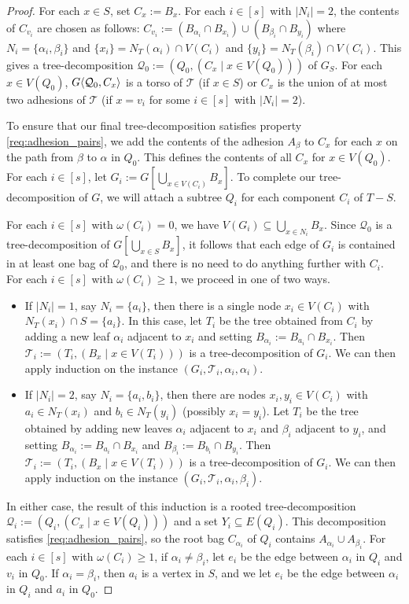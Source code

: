 \begin{proof}
  For each $x\in S$, set $C_x:=B_x$.  For each $i\in[s]$ with $|N_i|=2$, the contents of $C_{v_i}$ are chosen as follows: $C_{v_i}:=(B_{\alpha_i}\cap B_{x_i})\cup (B_{\beta_i}\cap B_{y_i})$ where $N_i=\{\alpha_i,\beta_i\}$ and $\{x_i\}=N_T(\alpha_i)\cap V(C_i)$ and $\{y_i\}=N_T(\beta_i)\cap V(C_i)$.  This gives a tree-decomposition $\mathcal{Q}_0:=(Q_0,(C_x\mid x\in V(Q_0)))$ of $G_S$. For each $x\in V(Q_0)$, ${G}\langle{\mathcal{Q}_0,C_x}\rangle$ is a torso of $\mathcal{T}$ (if $x\in S$) or $C_x$ is the union of at most two adhesions of $\mathcal{T}$ (if $x=v_i$ for some $i\in[s]$ with $|N_i|=2$). 
  
  To ensure that our final tree-decomposition satisfies property \ref{req:adhesion_pairs}, we add the contents of the adhesion $A_\beta$ to $C_x$ for each $x$ on the path from $\beta$ to $\alpha$ in $Q_0$. This defines the contents of all $C_x$ for $x\in V(Q_0)$. For each $i\in[s]$, let $G_i:=G[\bigcup_{x\in V(C_i)}B_x]$.  To complete our tree-decomposition of $G$, we will attach a subtree $Q_i$ for each component $C_i$ of $T-S$.

  For each $i\in[s]$ with $\omega(C_i) = 0$, we have $V(G_i)\subseteq \bigcup_{x\in N_i} B_x$.  Since $\mathcal{Q}_0$ is a tree-decomposition of $G[\bigcup_{x\in S}B_x]$, it follows that each edge of $G_i$ is contained in at least one bag of $\mathcal{Q}_0$, and there is no need to do anything further with $C_i$.  For each $i\in[s]$ with $\omega(C_i)\ge 1$, we proceed in one of two ways. 
  \begin{itemize}
    \item If $|N_i|=1$, say $N_i=\{a_i\}$, then there is a single node $x_i\in V(C_i)$ with $N_T(x_i)\cap S=\{a_i\}$. In this case, let $T_i$ be the tree obtained from $C_i$ by adding a new leaf $\alpha_i$ adjacent to $x_i$ and setting $B_{\alpha_i}:=B_{a_i}\cap B_{x_i}$.  Then $\mathcal{T}_i:=(T_i, (B_x\mid x\in V(T_i)))$ is a tree-decomposition of $G_i$.  We can then apply induction on the instance $(G_i,\mathcal{T}_i,\alpha_i,\alpha_i)$.
    \item If $|N_i|=2$, say $N_i=\{a_i,b_i\}$, then there are nodes $x_i,y_i\in V(C_i)$ with $a_i\in N_T(x_i)$ and $b_i\in N_T(y_i)$ (possibly $x_i=y_i$). Let $T_i$ be the tree obtained by adding new leaves $\alpha_i$ adjacent to $x_i$ and $\beta_i$ adjacent to $y_i$, and setting $B_{\alpha_i}:=B_{a_i}\cap B_{x_i}$ and $B_{\beta_i}:=B_{b_i}\cap B_{y_i}$.  Then $\mathcal{T}_i:=(T_i, (B_x\mid x\in V(T_i)))$ is a tree-decomposition of $G_i$.  We can then apply induction on the instance $(G_i,\mathcal{T}_i,\alpha_i,\beta_i)$.
  \end{itemize}
  In either case, the result of this induction is a rooted tree-decomposition $\mathcal{Q}_i:=(Q_i,(C_x\mid x\in V(Q_i)))$ and a set $Y_i\subseteq E(Q_i)$.
  This decomposition satisfies \ref{req:adhesion_pairs}, so the root bag $C_{\alpha_i}$ of $Q_i$ contains $A_{\alpha_i}\cup A_{\beta_i}$. For each $i\in[s]$ with $\omega(C_i)\ge 1$, if $\alpha_i \neq \beta_i$, let $e_i$ be the edge between $\alpha_i$ in $Q_i$ and $v_i$ in $Q_0$. If $\alpha_i=\beta_i$, then $a_i$ is a vertex in $S$, and we let $e_i$ be the edge between $\alpha_i$ in $Q_i$ and $a_i$ in $Q_0$. 
  

\end{proof}
